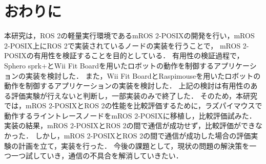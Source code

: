 \chapter{おわりに}
本研究は，ROS 2の軽量実行環境であるmROS 2-POSIXの開発を行い，mROS 2-POSIX上にROS 2で実装されているノードの実装を行うことで，
mROS 2-POSIXの有用性を検証することを目的としている．
有用性の検証過程で，Sphero sprk+とWii Fit Boardを用いたロボットの動作を制御するアプリケーションの実装を検討した．
また，Wii Fit BoardとRaspimouseを用いたロボットの動作を制御するアプリケーションの実装を検討した．
上記の検討は有用性のある評価実験が行えないと判断し，一部実装のみで終了した．
そのため，本研究では，mROS 2-POSIXとROS 2の性能を比較評価するために，ラズパイマウスで動作するライントレースノードをmROS 2-POSIXに移植し，比較評価試みた．
実装の結果，mROS 2-POSIXとROS 2の間で通信が成功せず，比較評価ができなかった．
しかし，mROS 2-POSIXとROS 2の間で通信が成功した場合の評価実験の計画を立て，実装を行った．
今後の課題として，現状の問題の解決策を一つ一つ試していき，通信の不具合を解消していきたい．
